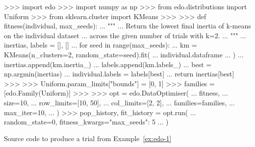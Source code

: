 \begin{listing}[htbp]
\begin{usagepy}
>>> import edo
>>> import numpy as np
>>> from edo.distributions import Uniform
>>> from sklearn.cluster import KMeans
>>> 
>>> def fitness(individual, max_seeds):
...     """
...     Return the lowest final inertia of k-means on the individual dataset
...     across the given number of trials with k=2.
...     """
...     inertias, labels = [], []
...     for seed in range(max_seeds):
...         km = KMeans(n_clusters=2, random_state=seed).fit(
...             individual.dataframe
...         )
...         inertias.append(km.inertia_)
...         labels.append(km.labels_)
...     best = np.argmin(inertias)
...     individual.labels = labels[best]
...     return inertias[best]
>>> 
>>> Uniform.param_limits["bounds"] = [0, 1]
>>> families = [edo.Family(Uniform)]
>>> 
>>> opt = edo.DataOptimiser(
...     fitness,
...     size=10,
...     row_limits=[10, 50],
...     col_limits=[2, 2],
...     families=families,
...     max_iter=10,
... )
>>> pop_history, fit_history = opt.run(
...     random_state=0, fitness_kwargs={"max_seeds": 5}
... )

\end{usagepy}
\caption{Source code to produce a trial from Example~\ref{ex:edo-1}}
\end{listing}
